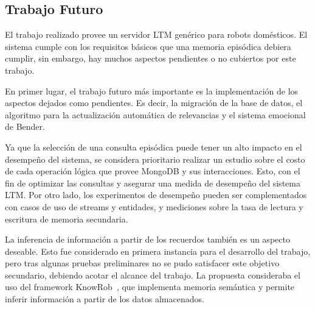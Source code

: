 \begin{conclusion}
\section*{Trabajo Futuro}

El trabajo realizado provee un servidor LTM genérico para robots domésticos. El sistema cumple con los requisitos básicos que una memoria episódica debiera cumplir, sin embargo, hay muchos aspectos pendientes o no cubiertos por este trabajo.

En primer lugar, el trabajo futuro más importante es la implementación de los aspectos dejados como pendientes. Es decir, la migración de la base de datos, el algoritmo para la actualización automática de relevancias y el sistema emocional de Bender.

Ya que la selección de una consulta episódica puede tener un alto impacto en el desempeño del sistema, se considera prioritario realizar un estudio sobre el costo de cada operación lógica que provee MongoDB y sus interacciones. Esto, con el fin de optimizar las consultas y asegurar una medida de desempeño del sistema LTM. Por otro lado, los experimentos de desempeño pueden ser complementados con casos de uso de streams y entidades, y mediciones sobre la tasa de lectura y escritura de memoria secundaria.

La inferencia de información a partir de los recuerdos también es un aspecto deseable. Esto fue considerado en primera instancia para el desarrollo del trabajo, pero tras algunas pruebas preliminares no se pudo satisfacer este objetivo secundario, debiendo acotar el alcance del trabajo. La propuesta consideraba el uso del framework KnowRob~\cite{Winkler2014,Tenorth2013,Tenorth2009}, que implementa memoria semántica y permite inferir información a partir de los datos almacenados.



\end{conclusion}